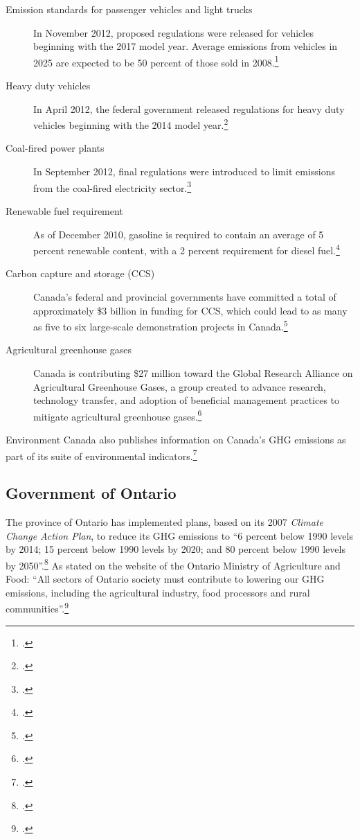 \documentclass[10pt]{article}
\begin{document}
\begin{description}
	\item[Emission standards for passenger vehicles and light trucks] In November 2012, proposed regulations were released for vehicles beginning with the 2017 model year. 
	Average emissions from vehicles in 2025 are expected to be 50 percent of those sold in 2008.\footcite[][]{ECReducing}
	\item[Heavy duty vehicles] In April 2012, the federal government released regulations for heavy duty vehicles beginning with the 2014 model year.\footcite[][]{ECReducing}
	\item[Coal-fired power plants] In September 2012, final regulations were introduced to limit emissions from the coal-fired electricity sector.\footcite[][]{ECCoalFired}
	\item[Renewable fuel requirement] As of December 2010, gasoline is required to contain an average of 5 percent renewable content, with a 2 percent requirement for diesel fuel.\footcite[][]{ECReducing}
	\item[Carbon capture and storage (CCS)] Canada's federal and provincial governments have committed a total of approximately \$3 billion in funding for CCS, which could lead to as many as five to six large-scale demonstration projects in Canada.\footcite[][]{ECReducing}
	\item[Agricultural greenhouse gases] Canada is contributing \$27 million toward the Global Research Alliance on Agricultural Greenhouse Gases, a group created to advance research, technology transfer, and adoption of beneficial management practices to mitigate agricultural greenhouse gases.\footcite[][]{ECReducing}
\end{description}		
		


Environment Canada also publishes information on Canada's GHG emissions as part of its suite of environmental indicators.\footcite[][]{ECGHGIndicators}


		
		\subsection{Government of Ontario}



The province of Ontario has implemented plans, based on its 2007 \emph{Climate Change Action Plan}, to reduce its GHG emissions to ``6 percent below 1990 levels by 2014; 15 percent below 1990 levels by 2020; and 80 percent below 1990 levels by 2050''.\footcite[][p.3]{20082009ActionPlan}
As stated on the website of the Ontario Ministry of Agriculture and Food: ``All sectors of Ontario society must contribute to lowering our GHG emissions, including the agricultural industry, food processors and rural communities''.\footcite[][]{OntarioCCandAg}
\end{document}
